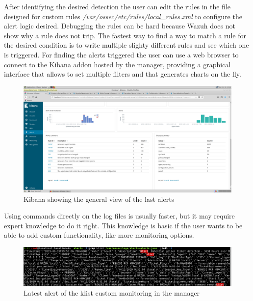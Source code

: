 \linej
\linej
After identifying the desired detection the user can edit the rules in the file designed for custom rules \textit{/var/ossec/etc/rules/local\_rules.xml} to configure the alert logic desired.
Debugging the rules can be hard because Wazuh does not show why a rule does not trip.
The fastest way to find a way to match a rule for the desired condition is to write multiple slighty different rules and see which one is triggered.
\linej
\linej
For finding the alerts triggered the user can use a web browser to connect to the Kibana addon hosted by the manager, providing a graphical interface that allows to set multiple filters and that generates charts on the fly.
\begin{figure}[H]
  \centering
	\includegraphics[width=\textwidth]{figuras/Kibana.png}
	\caption{Kibana showing the general view of the last alerts}
\end{figure}
\linej

Using commands directly on the log files is usually faster, but it may require expert knowledge to do it right.
This knowledge is basic if the user wants to be able to add custom functionality, like more monitoring options.
\begin{figure}[H]
  \centering
	\includegraphics[width=\textwidth]{figuras/klist_alert.png}
	\caption{Latest alert of the klist custom monitoring in the manager}
\end{figure}


